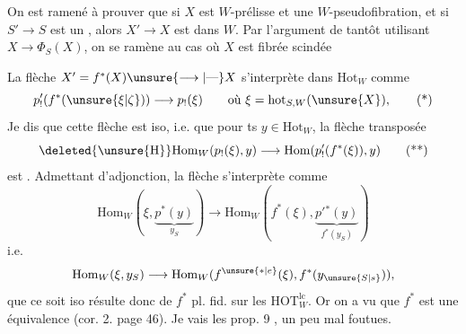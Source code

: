 On est ramené à prouver que si $X$ est $W$-prélisse   et une $W$-pseudofibration,  et si $S'\longrightarrow S$ est un , alors $X'\longrightarrow X$ est dans $W$. Par l'argument de  tantôt utilisant $X\longrightarrow\Phi_S(X)$, on se ramène au cas où $X$ est fibrée scindée

La flèche $X'=f^*(X)\unsure{\longrightarrow|\text{---}}X$ s'interprète dans $\mathrm{Hot}_W$ comme
\[
p'_!(f^*(\unsure{\xi|\zeta}))\longrightarrow p_!(\xi)\qquad\text{où }\xi=\mathrm{hot}_{S,W}(\unsure{X}),\tag*{(*)}
\]
Je dis que cette flèche est iso, i.e. que pour ts $y\in\mathrm{Hot}_W$, la flèche transposée
\[
\deleted{\unsure{\mathrm H}}\mathrm{Hom}_W(p_!(\xi),y)\longrightarrow\mathrm{Hom}(p'_!(f^*(\xi)),y)\tag*{(**)}
\]
est . Admettant  d'adjonction, la flèche \unsure{(**)} s'interprète comme
\[
\mathrm{Hom}_W(\xi,\underbrace{p^*(y)}_{y_S})\longrightarrow\mathrm{Hom}_W(f^*(\xi),\underbrace{p'{}^*(y)}_{f^*(y_S)})
\]
i.e.
\[
\mathrm{Hom}_W(\xi,y_S)\longrightarrow\mathrm{Hom}_W(f^{\unsure{*|e}}(\xi),f^*(y_{\unsure{S|s}})),
\]
que ce soit iso résulte donc de $f^*$ pl. fid. sur les $\mathrm{HOT}_W^{\mathrm{lc}}$. Or on a vu que $f^*$ est une équivalence (cor. 2. page 46).
Je vais  les prop. 9 , un peu mal foutues.

